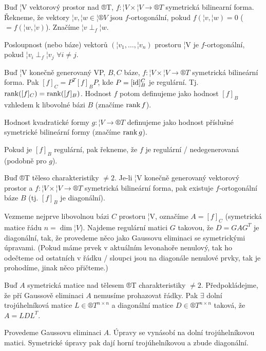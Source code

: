 \documentclass[12pt]{article}                   %
\begin{document}

        \begin{definice}[$f$-ortogonální]
            Buď ¦V vektorový prostor nad ®T, $f: ¦V \times ¦V \rightarrow ®T$ symetrická bilinearní forma. Řekneme, že vektory $¦v, ¦w \in ¦®V$ jsou $f$-ortogonální, pokud $f(¦v, ¦w) = 0$ ($ = f(¦w, ¦v)$). Značíme $¦v \perp_f ¦w$.

            Posloupnost (nebo báze) vektorů $(¦v_1, …, ¦v_n)$ prostoru ¦V je $f$-ortogonální, pokud $¦v_i \perp_f ¦v_j$ $\forall i ≠ j$.
        \end{definice}

        \begin{definice}
            Buď ¦V konečně generovaný VP, $B, C$ báze, $f: ¦V \times ¦V \rightarrow ®T$ symetrická bilineární forma. Pak $[f]_C = P^T [f]_B P$, kde $P = [\operatorname{id}]_B^C$ je regulární. Tj. $\operatorname{rank}([f]_C) = \operatorname{rank}([f]_B)$. Hodnost $f$ potom definujeme jako hodnost $[f]_B$ vzhledem k libovolné bázi $B$ (značíme $\operatorname{rank} f$).

            Hodnost kvadratické formy $g: ¦V \rightarrow ®T$ definujeme jako hodnost příslušné symetrické bilineární formy (značíme $\operatorname{rank} g$).

            Pokud je $[f]_B$ regulární, pak řekneme, že $f$ je regulární / nedegenerovaná (podobně pro $g$).
        \end{definice}

        \begin{veta}
            Buď ®T těleso charakteristiky $≠ 2$. Je-li ¦V konečně generovaný vektorový prostor a $f: ¦V \times ¦V \rightarrow ®T$ symetrická bilineární forma, pak existuje $f$-ortogonální báze $B$ (tj. $[f]_B$ je diagonální).

            \begin{dukazin}
                Vezmeme nejprve libovolnou bázi $C$ prostoru ¦V, označíme $A = [f]_C$ (symetrická matice řádu $n = \dim ¦V$). Najdeme regulární matici $G$ takovou, že $D = GAG^T$ je diagonální, tak, že provedeme něco jako Gaussovu eliminaci se symetrickými úpravami. (Pokud máme prvek v aktuálním levonahoře nenulový, tak ho odečteme od ostatních v řádku / sloupci jsou na diagonále nenulové prvky, tak je prohodíme, jinak něco přičteme.)
            \end{dukazin}
        \end{veta}

        \begin{tvrzeni}
            Buď $A$ symetrická matice nad tělesem ®T charakteristiky $≠ 2$. Předpokládejme, že pří Gaussově eliminaci $A$ nemusíme prohazovat řádky. Pak $\exists$ dolní trojúhelníková matice $L \in ®T^{n \times n}$ a diagonální matice $D \in ®T^{n \times n}$ taková, že $A = LDL^T$.

            \begin{dukazin}
                Provedeme Gaussovu eliminaci $A$. Úpravy se vynásobí na dolní trojúhelníkovou matici. Symetrické úpravy pak dají horní trojúhelníkovou a zbude diagonální.
            \end{dukazin}
        \end{tvrzeni}
\end{document}

